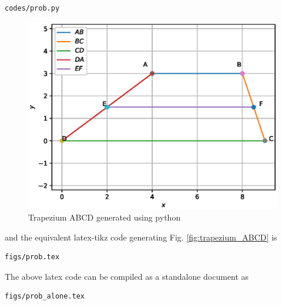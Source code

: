 \begin{enumerate}[label=\thesection.\arabic*.,ref=\thesection.\theenumi]
\begin{lstlisting}
codes/prob.py
\end{lstlisting}
\begin{figure}[!ht]
\centering
\includegraphics[width=\columnwidth]{./codes/pyfigs/pyfigs.eps}
\caption{Trapezium ABCD generated using python}
\label{fig:trap_py}
\end{figure}

%
and the equivalent latex-tikz code generating Fig. \ref{fig:trapezium_ABCD} is 
\begin{lstlisting}
figs/prob.tex
\end{lstlisting}
%
The above latex code can be compiled as a standalone document as
\begin{lstlisting}
figs/prob_alone.tex
\end{lstlisting}

%

%

%
%

\end{enumerate}
